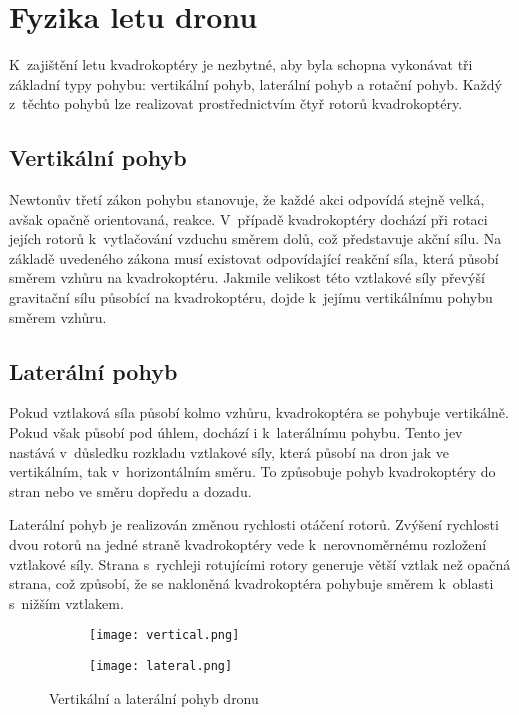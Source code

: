\documentclass[12pt]{report}
\begin{document}
\chapter[Fyzika letu dron]{Fyzika letu dronu}
K~zajištění letu kvadrokoptéry je nezbytné, aby byla schopna vykonávat tři základní typy pohybu: vertikální pohyb, laterální pohyb a rotační pohyb. Každý z~těchto pohybů lze realizovat prostřednictvím čtyř rotorů kvadrokoptéry.

\section[Vertikální pohyb]{Vertikální pohyb}
Newtonův třetí zákon pohybu stanovuje, že každé akci odpovídá stejně velká, avšak opačně orientovaná, reakce. V~případě kvadrokoptéry dochází při rotaci jejích rotorů k~vytlačování vzduchu směrem dolů, což představuje akční sílu. Na základě uvedeného zákona musí existovat odpovídající reakční síla, která působí směrem vzhůru na kvadrokoptéru. Jakmile velikost této vztlakové síly převýší gravitační sílu působící na kvadrokoptéru, dojde k~jejímu vertikálnímu pohybu směrem vzhůru.

\section[Laterální pohyb]{Laterální pohyb}
Pokud vztlaková síla působí kolmo vzhůru, kvadrokoptéra se pohybuje vertikálně. Pokud však působí pod úhlem, dochází i k~laterálnímu pohybu. Tento jev nastává v~důsledku rozkladu vztlakové síly, která působí na dron jak ve vertikálním, tak v~horizontálním směru. To způsobuje pohyb kvadrokoptéry do stran nebo ve směru dopředu a dozadu.

Laterální pohyb je realizován změnou rychlosti otáčení rotorů. Zvýšení rychlosti dvou rotorů na jedné straně kvadrokoptéry vede k~nerovnoměrnému rozložení vztlakové síly. Strana s~rychleji rotujícími rotory generuje větší vztlak než opačná strana, což způsobí, že se nakloněná kvadrokoptéra pohybuje směrem k~oblasti s~nižším vztlakem.

\begin{figure}[H]
    \begin{subfigure}{0.45\linewidth}
        \centering
        \texttt{[image: vertical.png]}
    \end{subfigure}
    \hfill
    \begin{subfigure}{0.45\linewidth}
        \texttt{[image: lateral.png]}
    \end{subfigure}
    \caption{Vertikální a laterální pohyb dronu \cite{nasa}}
    \label{fig:batteries}
\end{figure}
\end{document}
